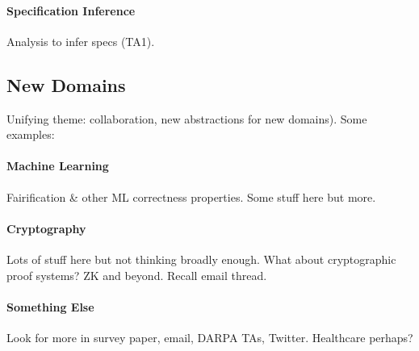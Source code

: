 \paragraph{Specification Inference} Analysis to infer specs (TA1).

\subsection*{New Domains}

Unifying theme: collaboration, new abstractions for new domains). Some examples:

\paragraph{Machine Learning} Fairification \& other ML correctness properties. Some stuff here but more.

\paragraph{Cryptography} Lots of stuff here but not thinking broadly enough. What about cryptographic proof systems? ZK and beyond. Recall email thread.

\paragraph{Something Else} Look for more in survey paper, email, DARPA TAs, Twitter. Healthcare perhaps? %
